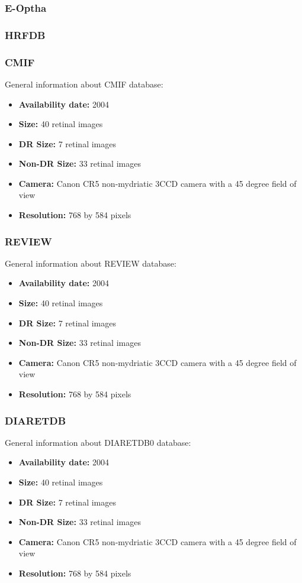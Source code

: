 \subsubsection{E-Optha}
\subsubsection{HRFDB}

\subsubsection{CMIF}
General information about CMIF database:
\begin{itemize}
    \item \textbf{Availability date: } 2004
    \item \textbf{Size: } 40 retinal images
    \item \textbf{DR Size: } 7 retinal images
    \item \textbf{Non-DR Size: } 33 retinal images
    \item \textbf{Camera: } Canon CR5 non-mydriatic 3CCD camera with a 45 degree field of view
    \item \textbf{Resolution: } 768 by 584 pixels
\end{itemize}

\subsubsection{REVIEW}
General information about REVIEW database:
\begin{itemize}
    \item \textbf{Availability date: } 2004
    \item \textbf{Size: } 40 retinal images
    \item \textbf{DR Size: } 7 retinal images
    \item \textbf{Non-DR Size: } 33 retinal images
    \item \textbf{Camera: } Canon CR5 non-mydriatic 3CCD camera with a 45 degree field of view
    \item \textbf{Resolution: } 768 by 584 pixels
\end{itemize}

\subsubsection{DIARETDB}
General information about DIARETDB0 database:
\begin{itemize}
    \item \textbf{Availability date: } 2004
    \item \textbf{Size: } 40 retinal images
    \item \textbf{DR Size: } 7 retinal images
    \item \textbf{Non-DR Size: } 33 retinal images
    \item \textbf{Camera: } Canon CR5 non-mydriatic 3CCD camera with a 45 degree field of view
    \item \textbf{Resolution: } 768 by 584 pixels
\end{itemize}

